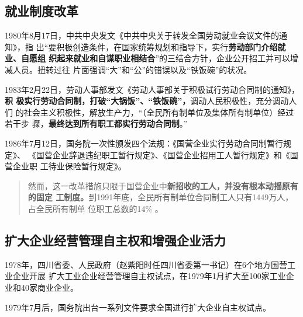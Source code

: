 \subsection{就业制度改革}

1980年8月17日，中共中央发文《中共中央关于转发全国劳动就业会议文件的通知》，指
出“要积极创造条件，在国家统筹规划和指导下，实行\textbf{劳动部门介绍就业、自愿组
  织起来就业和自谋职业相结合}”的三结合方针，企业公开招工并可以增减人员。扭转过往
片面强调“大”和“公”的错误以及“铁饭碗”的状况。

1983年2月22日，劳动人事部发文《劳动人事部关于积极试行劳动合同制的通知》，\textbf{积
  极实行劳动合同制，打破“大锅饭”、“铁饭碗”，}调动人民积极性，充分调动人们
的社会主义积极性，解放生产力，“（全民所有制单位及集体所有制单位）经过若干步
骤，\textbf{最终达到所有职工都实行劳动合同制}。”

1986年7月12日，国务院一次性颁发四个法规：《国营企业实行劳动合同制暂行规定》、
《国营企业辞退违纪职工暂行规定》、《国营企业招用工人暂行规定》和《国营企业职
工待业保险暂行规定》。
\begin{quotation}
  然而，这一改革措施只限于国营企业中\textbf{新招收的工人，并没有根本动摇原有的固定
    工制度。}到1991年底，全民所有制单位合同制工人只有1449万人，占全民所有制单
  位职工总数的14\% 。\cite{laodongzhiduyuanfang}
\end{quotation}



\subsection{扩大企业经营管理自主权和增强企业活力}

1978年，四川省委、人民政府（赵紫阳时任四川省委第一书记）在6个地方国营工业企业开展
扩大工业企业经营管理自主权试点，在1979年1月扩大至100家工业企业和40家商业企业。

1979年7月后，国务院出台一系列文件要求全国进行扩大企业自主权试点。

